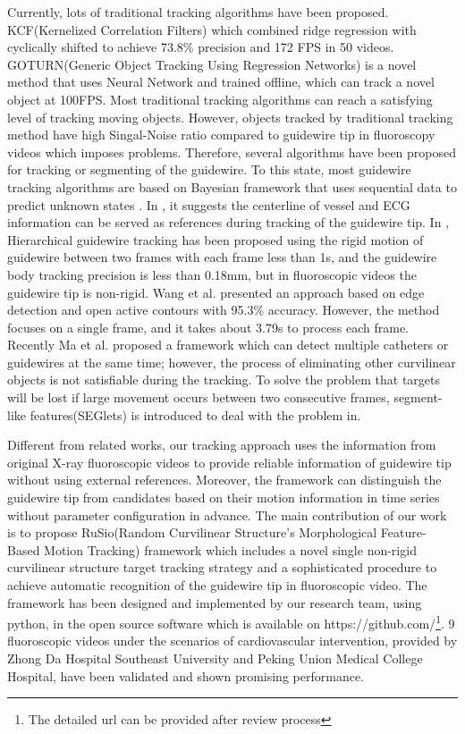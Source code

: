 \documentclass[letterpaper, 10 pt, conference]{ieeeconf}  %
\begin{document}
Currently, lots of traditional tracking algorithms have been proposed. KCF(Kernelized Correlation Filters) \cite{c1} which combined ridge regression with cyclically shifted to achieve 73.8\% precision and 172 FPS in 50 videos. GOTURN(Generic Object Tracking Using Regression Networks)\cite{c2} is a novel method that uses Neural Network and trained offline, which can track a novel object at 100FPS. Most traditional tracking algorithms can reach a satisfying level of tracking moving objects. However, objects tracked by traditional tracking method have high Singal-Noise ratio compared to guidewire tip in fluoroscopy videos which imposes problems. Therefore, several algorithms have been proposed for tracking or segmenting of the guidewire. To this state, most guidewire tracking algorithms are based on Bayesian framework that uses sequential data to predict unknown states \cite{c3}.
In \cite{c4}, it suggests the centerline of vessel and ECG information can be served as references during tracking of the guidewire tip. 
In \cite{c5}, Hierarchical guidewire tracking has been proposed using the rigid motion of guidewire between two frames with each frame less than 1s, and the guidewire body tracking precision is less than 0.18mm, but in fluoroscopic videos the guidewire tip is non-rigid. Wang et al. \cite{c6} presented an approach based on edge detection and open active contours with 95.3\% accuracy. However, the method focuses on a single frame, and it takes about 3.79s to process each frame. Recently Ma et al. \cite{c7} proposed a framework which can detect multiple catheters or guidewires at the same time; however, the process of eliminating other curvilinear objects is not satisfiable during the tracking. To solve the problem that targets will be lost if large movement occurs between two consecutive frames, segment-like features(SEGlets) is introduced to deal with the problem in\cite{c8}.

Different from related works, our tracking approach uses the information from original X-ray fluoroscopic videos to provide reliable information of guidewire tip without using external references. Moreover, the framework can distinguish the guidewire tip from candidates based on their motion information in time series without parameter configuration in advance. The main contribution of our work is to propose RuSio(Random Curvilinear Structure's Morphological Feature-Based Motion Tracking) framework which includes a novel single non-rigid curvilinear structure target tracking strategy and a sophisticated procedure to achieve automatic recognition of the guidewire tip in fluoroscopic video. The framework has been designed and implemented by our research team, using python, in the open source software which is available on https://github.com/\footnote{The detailed url can be provided after review process}. 9 fluoroscopic videos under the scenarios of cardiovascular intervention, provided by Zhong Da Hospital Southeast University and Peking Union Medical College Hospital, have been validated and shown promising performance. 
\end{document}
